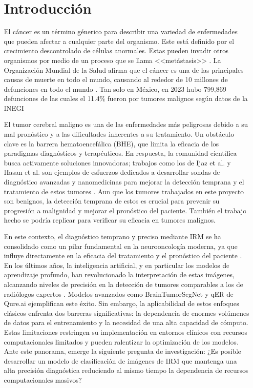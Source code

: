 \section{Introducción}

El cáncer es un término génerico para describir una variedad de enfermedades que pueden afectar a cualquier parte del organismo. Este está definido por el crecimiento descontrolado de células anormales. Estas pueden invadir otros organismos por medio de un proceso que se llama <<metástasis>> \cite{cancer_gov_que_es}. La Organización Mundial de la Salud afirma que el cáncer es una de las principales causas de muerte en todo el mundo, causando al rededor de 10 millones de defunciones en todo el mundo \cite{who_cancer_2022}. Tan solo en México, en 2023 hubo 799,869 defunciones de las cuales el 11.4\% fueron por tumores malignos según datos de la INEGI \cite{INEGI2025}

El tumor cerebral maligno es una de las enfermedades más peligrosas debido a su mal pronóstico y a las dificultades inherentes a su tratamiento. Un obstáculo clave es la barrera hematoencefálica (BHE), que limita la eficacia de los paradigmas diagnósticos y terapéuticos. En respuesta, la comunidad científica busca activamente soluciones innovadoras; trabajos como los de Ijaz et al. y Hasan et al. son ejemplos de esfuerzos dedicados a desarrollar sondas de diagnóstico avanzadas y nanomedicinas para mejorar la detección temprana y el tratamiento de estos tumores \cite{ijaz_diagnostics_2025, hasan_recent_2023}. Aun que los tumores trabajados en este proyecto son benignos, la detección temprana de estos es crucial para prevenir su progresión a malignidad y mejorar el pronóstico del paciente. También el trabajo hecho se podría replicar para verificar su eficacia en tumores malignos.


En este contexto, el diagnóstico temprano y preciso mediante IRM se ha consolidado como un pilar fundamental en la neurooncología moderna, ya que influye directamente en la eficacia del tratamiento y el pronóstico del paciente \cite{Akkus2017deep}. En los últimos años, la inteligencia artificial, y en particular los modelos de aprendizaje profundo, han revolucionado la interpretación de estas imágenes, alcanzando niveles de precisión en la detección de tumores comparables a los de radiólogos expertos \cite{pereira2016brain, liew2018artificial}. Modelos avanzados como BrainTumorSegNet \cite{XiaojunHu2020} y qER de Qure.ai \cite{Qure.ai2024} ejemplifican este éxito. Sin embargo, la aplicabilidad de estos enfoques clásicos enfrenta dos barreras significativas: la dependencia de enormes volúmenes de datos para el entrenamiento y la necesidad de una alta capacidad de cómputo. Estas limitaciones restringen su implementación en entornos clínicos con recursos computacionales limitados y pueden ralentizar la optimización de los modelos. Ante este panorama, emerge la siguiente pregunta de investigación: ¿Es posible desarrollar un modelo de clasificación de imágenes de IRM que mantenga una alta precisión diagnóstica reduciendo al mismo tiempo la dependencia de recursos computacionales masivos?


